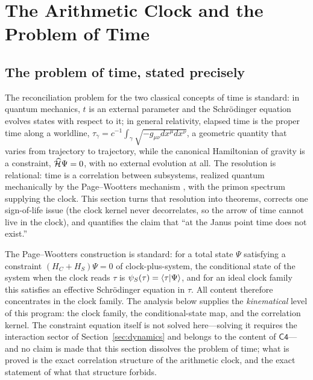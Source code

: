 
\section{The Arithmetic Clock and the Problem of Time}\label{sec:time}

\subsection{The problem of time, stated precisely}

The reconciliation problem for the two classical concepts of time is standard: in
quantum mechanics, $t$ is an external parameter and the Schr{\"o}dinger equation evolves
states with respect to it; in general relativity, elapsed time is the proper time along a
worldline, $\tau_{\gamma}=c^{-1}\int_{\gamma}\sqrt{-g_{\mu\nu}dx^{\mu}dx^{\nu}}$, a geometric
quantity that varies from trajectory to trajectory, while the canonical Hamiltonian of
gravity is a constraint, $\widehat{\mathcal{H}}\Psi=0$, with no external evolution at all. The
resolution is relational: time is a correlation between subsystems, realized quantum
mechanically by the Page--Wootters mechanism \cite{pagewootters1983}, with the primon
spectrum supplying the clock. This section turns that resolution into theorems, corrects
one sign-of-life issue (the clock kernel never decorrelates, so the arrow
of time cannot live in the clock), and quantifies the claim that ``at the
Janus point time does not exist.''

The Page--Wootters construction is standard: for a total state $\Psi$ satisfying a constraint
$(H_{C}+H_{S})\Psi=0$ of clock-plus-system, the conditional state of the system when the
clock reads $\tau$ is $\psi_{S}(\tau)=\langle \tau\rvert\Psi\rangle$, and for an ideal clock family
this satisfies an effective Schr{\"o}dinger equation in $\tau$. All content therefore
concentrates in the clock family. The analysis below supplies the \emph{kinematical} level of
this program: the clock family, the conditional-state map, and the correlation kernel. The
constraint equation itself is not solved here---solving it requires the interaction sector of
Section~\ref{sec:dynamics} and belongs to the content of $\mathsf{C4}$---and no claim is made
that this section dissolves the problem of time; what is proved is the exact correlation
structure of the arithmetic clock, and the exact statement of what that structure forbids.

